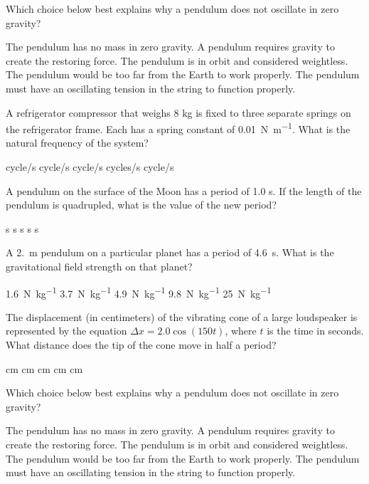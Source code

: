 \documentclass{../../../oss-ap12ibhl-print}
\begin{document}
\begin{questions}
  \question Which choice below best explains why a pendulum does not oscillate
  in zero gravity?
  \begin{choices}
    \choice The pendulum has no mass in zero gravity.
    \choice A pendulum requires gravity to create the restoring force.
    \choice The pendulum is in orbit and considered weightless.
    \choice The pendulum would be too far from the Earth to work properly.
    \choice The pendulum must have an oscillating tension in the string to
    function properly.
  \end{choices}
  \newpage
  
  \question A refrigerator compressor that weighs 8 kg is fixed to three
  separate springs on the refrigerator frame. Each has a spring constant of
  \SI{0.01}{\newton\per\metre}. What is the natural frequency of the system?
  \begin{choices}
     cycle/s
     cycle/s
     cycle/s
     cycles/s
     cycle/s
  \end{choices}
  
  \question A pendulum on the surface of the Moon has a period of 1.0 s. If the
  length of the pendulum is quadrupled, what is the value of the new period?
  \begin{choices}
     s
     s
     s
     s
     s
  \end{choices}
    
  \question A \SI{2.}{\metre} pendulum on a particular planet has a period of
  \SI{4.6}{\second}. What is the gravitational field strength on that planet?
  \begin{choices}
    \choice\SI{1.6}{\newton\per\kilo\gram}
    \choice\SI{3.7}{\newton\per\kilo\gram}
    \choice\SI{4.9}{\newton\per\kilo\gram}
    \choice\SI{9.8}{\newton\per\kilo\gram}
    \choice\SI{25}{\newton\per\kilo\gram}
  \end{choices}

  \question The displacement (in centimeters) of the vibrating cone of a large
  loudspeaker is represented by the equation $\Delta x=2.0\cos(150t)$, where
  $t$ is the time in seconds. What distance does the tip of the cone move in
  half a period?
  \begin{choices}
     cm
     cm
     cm
     cm
     cm
  \end{choices}
  
  \question Which choice below best explains why a pendulum does not oscillate
  in zero gravity?
  \begin{choices}
    \choice The pendulum has no mass in zero gravity.
    \choice A pendulum requires gravity to create the restoring force.
    \choice The pendulum is in orbit and considered weightless.
    \choice The pendulum would be too far from the Earth to work properly.
    \choice The pendulum must have an oscillating tension in the string to
    function properly.
  \end{choices}


\end{questions}
\end{document}
